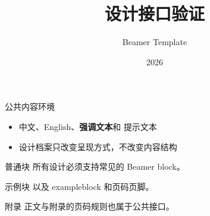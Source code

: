 \documentclass[aspectratio=169]{beamer}
\title{设计接口验证}
\author{Beamer Template}
\date{2026}
\begin{document}
\begin{frame}[shrink]
  \titlepage
\end{frame}

\begin{frame}{公共内容环境}
  \begin{itemize}
    \item 中文、English、\textbf{强调文本}和 \alert{提示文本}
    \item 设计档案只改变呈现方式，不改变内容结构
  \end{itemize}

  \begin{block}{普通块}
    所有设计必须支持常见的 Beamer block。
  \end{block}

  \begin{exampleblock}{示例块}
    以及 exampleblock 和页码页脚。
  \end{exampleblock}
\end{frame}

\appendix
\begin{frame}{附录}
  正文与附录的页码规则也属于公共接口。
\end{frame}
\end{document}
